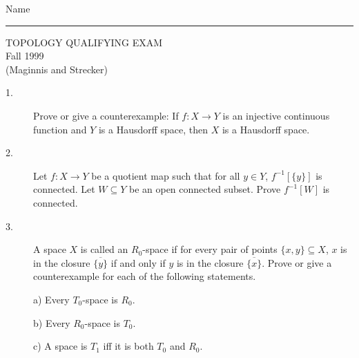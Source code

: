 \documentclass[bbb]{report}
\begin{document}

\begin{Large}

\hfill Name \rule{2.5in}{.01in}
\par
\vspace{.1in}

\begin{center}
   TOPOLOGY QUALIFYING EXAM \\
   Fall 1999 \\
   (Maginnis and Strecker) \\
\end{center}

\end{Large}

\vspace{.1in}

\begin{large}

\vspace{.2in}

\begin{description}

\item[1.]
Prove or give a counterexample:
 If  $f:X\to Y$ is an injective continuous function and $Y$
 is a Hausdorff space, then $X$ is a Hausdorff space.


\item[2.]
Let $f:X\to Y$ be a quotient map such that for all $y\in Y$,
$f^{-1}[\{y\}]$ is connected. Let $W\subseteq Y$ be an
open connected subset. Prove $f^{-1}[W]$ is connected.


\item[3.]
A space $X$ is called an $R_0$-space if for every pair of points
$\{x,y\}\subseteq X$, $x$ is in the closure $\overline{ \{y\} }$
if and only if $y$ is in the closure $\overline{\{ x\} }$.
Prove or give a counterexample for each of the following statements.
\item[\quad] a) Every $T_0$-space is $R_0$.
\item[\quad] b) Every $R_0$-space is $T_0$.
\item[\quad] c) A space is $T_1$ iff it is both $T_0$ and $R_0$.


\end{description}
\end{large}
\end{document}
